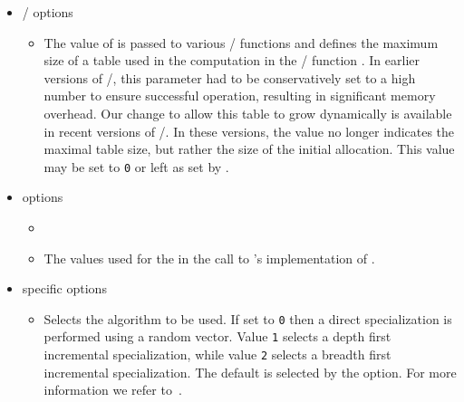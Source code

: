 \begin{itemize}
\item \PolyLib/ options

\begin{itemize}

\item {}

The value of  is passed to various \PolyLib/
functions and defines the
maximum size of a table used in the  computation
in the \PolyLib/ function .
In earlier versions of \PolyLib/,
this parameter had to be conservatively set
to a high number to ensure successful operation,
resulting in significant memory overhead.
Our change to allow this table to grow
dynamically is available in recent versions of \PolyLib/.
In these versions, the value no longer indicates the maximal
table size, but rather the size of the initial allocation.
This value may be set to \verb+0+ or left as set
by .

\end{itemize}

\item {} options

\begin{itemize}

\item {}
\item {}

The values used for the 
in the call to 's implementation of .

\end{itemize}

\item {} specific options

\begin{itemize}

\item {}

Selects the  algorithm to be used.
If set to {\tt 0} then a direct specialization is performed
using a random vector.
Value {\tt 1} selects a depth first incremental specialization,
while value {\tt 2} selects a breadth first incremental specialization.
The default is selected by the 
 option.
For more information we refer to~.

\end{itemize}

\end{itemize}

